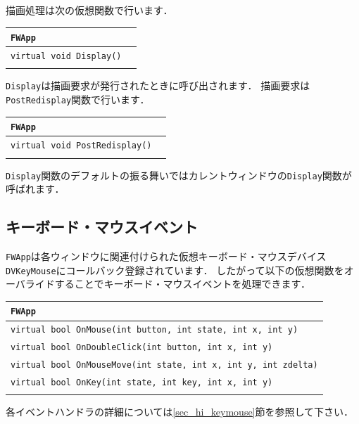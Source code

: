 \KLUDGE 描画処理は次の仮想関数で行います．

\noindent
\begin{tabular}{p{.7\hsize}p{.2\hsize}}
\\
\texttt{FWApp}						\\ \midrule
\texttt{virtual void Display()}	&	\\
\\
\end{tabular}

\texttt{Display}\KLUDGE は描画要求が発行されたときに呼び出されます．
\KLUDGE 描画要求は\texttt{PostRedisplay}\KLUDGE 関数で行います．

\noindent
\begin{tabular}{p{.7\hsize}p{.2\hsize}}
\\
\texttt{FWApp}							\\ \midrule
\texttt{virtual void PostRedisplay()}	&	\\
\\
\end{tabular}

\texttt{Display}\KLUDGE 関数のデフォルトの振る舞いではカレントウィンドウの\texttt{Display}\KLUDGE 関数が呼ばれます．

\subsection*{\KLUDGE キーボード・マウスイベント}

\texttt{FWApp}\KLUDGE は各ウィンドウに関連付けられた仮想キーボード・マウスデバイス\texttt{DVKeyMouse}\KLUDGE にコールバック登録されています．
\KLUDGE したがって以下の仮想関数をオーバライドすることでキーボード・マウスイベントを処理できます．

\noindent
\begin{tabular}{p{1.0\hsize}}
\\
\texttt{FWApp}							\\ \midrule
\texttt{virtual bool OnMouse(int button, int state, int x, int y)}	\\
\texttt{virtual bool OnDoubleClick(int button, int x, int y)}	\\
\texttt{virtual bool OnMouseMove(int state, int x, int y, int zdelta)}	\\
\texttt{virtual bool OnKey(int state, int key, int x, int y)}	\\
\\
\end{tabular}

\KLUDGE 各イベントハンドラの詳細については\ref{sec_hi_keymouse}\KLUDGE 節を参照して下さい．


